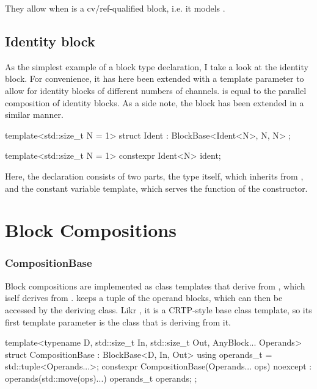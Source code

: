 They allow  when  is a cv/ref-qualified block, i.e. it models .

\subsection{Identity block}
As the simplest example of a block type declaration, I take a look at the identity block. For convenience, it
has here been extended with a template parameter  to allow for identity blocks of
different numbers of channels.
 is equal to the parallel composition of  identity blocks. As a side note, the \Cut block has been
extended in a similar manner.

\begin{cppcodenl}
  template<std::size_t N = 1>
  struct Ident : BlockBase<Ident<N>, N, N> {};
  
  template<std::size_t N = 1>
  constexpr Ident<N> ident;
\end{cppcodenl}

Here, the declaration consists of two parts, the  type itself, which inherits from , and the constant
 variable template, which serves the function of the constructor.

\section{Block Compositions}

\subsubsection{CompositionBase}

Block compositions are implemented as class templates that derive from , which iself
derives from
.  keeps a tuple of the operand blocks, which can then be accessed by the
deriving class. Likr , it is a CRTP-style base class template, so its first template
parameter is the class that is deriving from it.

\begin{cppcodenl}
  template<typename D, std::size_t In, std::size_t Out, AnyBlock... Operands>
  struct CompositionBase : BlockBase<D, In, Out> {
    using operands_t = std::tuple<Operands...>;
    constexpr CompositionBase(Operands... ops) noexcept : operands(std::move(ops)...) {}
    operands_t operands;
  };
\end{cppcodenl}

